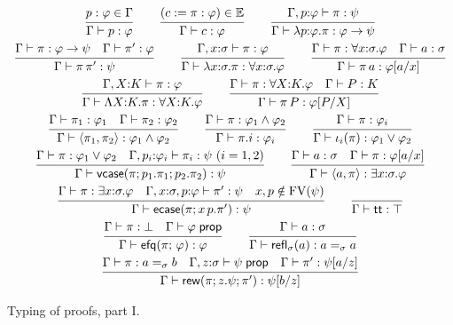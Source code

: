 \begin{figure}[tp]
\small
\[
\begin{array}{c}
\rul{p : \varphi \in \Gamma}{\Gamma \vdash p : \varphi}
\qquad
\rul{(c \defeq \pi : \varphi) \in \Env}{\Gamma \vdash c : \varphi}
\qquad
\rul{\Gamma, p{:}\varphi \vdash \pi : \psi}
    {\Gamma \vdash \lambda p{:}\varphi.\pi : \varphi \to \psi}
\\[2.2ex]
\rul{\Gamma \vdash \pi : \varphi \to \psi \quad \Gamma \vdash \pi' : \varphi}
    {\Gamma \vdash \pi\,\pi' : \psi}
\qquad
\rul{\Gamma, x{:}\sigma \vdash \pi : \varphi}
    {\Gamma \vdash \lambda x{:}\sigma.\pi : \forall x{:}\sigma.\varphi}
\qquad
\rul{\Gamma \vdash \pi : \forall x{:}\sigma.\varphi \quad \Gamma \vdash a : \sigma}
    {\Gamma \vdash \pi\,a : \subst{\varphi}{a}{x}}
\\[2.2ex]
\rul{\Gamma, X{:}K \vdash \pi : \varphi}
    {\Gamma \vdash \Lambda X{:}K.\pi : \forall X{:}K.\varphi}
\qquad
\rul{\Gamma \vdash \pi : \forall X{:}K.\varphi \quad \Gamma \vdash P : K}
    {\Gamma \vdash \pi\,P : \subst{\varphi}{P}{X}}
\\[2.2ex]
\rul{\Gamma \vdash \pi_1 : \varphi_1 \quad \Gamma \vdash \pi_2 : \varphi_2}
    {\Gamma \vdash \langle\pi_1,\pi_2\rangle : \varphi_1 \wedge \varphi_2}
\qquad
\rul{\Gamma \vdash \pi : \varphi_1 \wedge \varphi_2}
    {\Gamma \vdash \pi.i : \varphi_i}
\qquad
\rul{\Gamma \vdash \pi : \varphi_i}
    {\Gamma \vdash \iota_i(\pi) : \varphi_1 \vee \varphi_2}
\\[2.2ex]
\rul{\Gamma \vdash \pi : \varphi_1 \vee \varphi_2 \quad
     \Gamma, p_i{:}\varphi_i \vdash \pi_i : \psi \ (i = 1,2)}
    {\Gamma \vdash \mathsf{vcase}(\pi; p_1.\pi_1; p_2.\pi_2) : \psi}
\qquad
\rul{\Gamma \vdash a : \sigma \quad \Gamma \vdash \pi : \subst{\varphi}{a}{x}}
    {\Gamma \vdash \langle a, \pi \rangle : \exists x{:}\sigma.\varphi}
\\[2.2ex]
\rul{\Gamma \vdash \pi : \exists x{:}\sigma.\varphi \quad
     \Gamma, x{:}\sigma, p{:}\varphi \vdash \pi' : \psi \quad
     x, p \notin \fv{\psi}}
    {\Gamma \vdash \mathsf{ecase}(\pi; x\,p.\pi') : \psi}
\qquad
\rul{}{\Gamma \vdash \mathsf{tt} : \top}
\\[2.2ex]
\rul{\Gamma \vdash \pi : \bot \quad \Gamma \vdash \varphi \sprop}
    {\Gamma \vdash \texfalso{\pi}{\varphi} : \varphi}
\qquad
\rul{\Gamma \vdash a : \sigma}
    {\Gamma \vdash \mathsf{refl}_{\sigma}(a) : a =_{\sigma} a}
\\[2.2ex]
\rul{\Gamma \vdash \pi : a =_{\sigma} b \quad
     \Gamma, z{:}\sigma \vdash \psi \sprop \quad
     \Gamma \vdash \pi' : \subst{\psi}{a}{z}}
    {\Gamma \vdash \mathsf{rew}(\pi; z.\psi; \pi') : \subst{\psi}{b}{z}}
\end{array}
\]
\caption{Typing of proofs, part I.}
\label{fig:proofs}
\end{figure}

